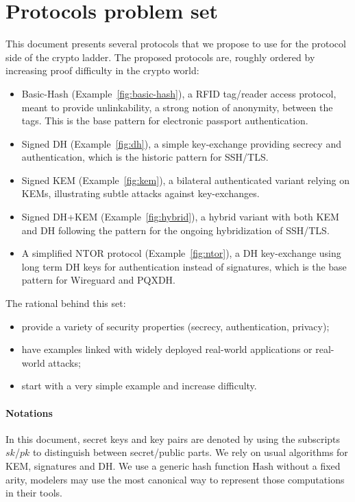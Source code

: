 \documentclass{article}
\newcommand{\sfsk}{\mathit{sk}}
\newcommand{\sfpk}{\mathit{pk}}
\newcommand{\kwf}[1]{\mathrm{#1}}
\newcommand{\hash}{\kwf{Hash}}
\begin{document}
\section{Protocols problem set}

This document presents several protocols that we propose to use for the protocol side of the crypto ladder. The proposed protocols are, roughly ordered by increasing proof difficulty in the crypto world:
\begin{itemize}
\item Basic-Hash (Example~\ref{fig:basic-hash}), a RFID tag/reader access protocol, meant to provide unlinkability, a strong notion of anonymity, between the tags. This is the base pattern for electronic passport authentication.
\item Signed DH (Example~\ref{fig:dh}), a simple key-exchange providing secrecy and authentication,  which is the historic pattern for SSH/TLS.
\item Signed KEM (Example~\ref{fig:kem}), a bilateral authenticated variant relying on KEMs, illustrating subtle attacks against key-exchanges. 
\item  Signed DH+KEM (Example~\ref{fig:hybrid}), a hybrid variant with both KEM and DH following the pattern for the ongoing hybridization of SSH/TLS.
\item A simplified NTOR protocol (Example~\ref{fig:ntor}), a DH key-exchange using long term DH keys for authentication instead of signatures, which is the base pattern for Wireguard and PQXDH.
\end{itemize}

The rational behind this set:
\begin{itemize}
\item provide a variety of security properties (secrecy, authentication, privacy);
\item have examples linked with widely deployed real-world applications or real-world attacks;
\item start with a very simple example and increase difficulty. 
\end{itemize}


\paragraph{Notations} In this document, secret keys and key pairs are denoted by using the subscripts $\sfsk$/$\sfpk$ to distinguish between secret/public parts. We rely on usual algorithms for KEM, signatures and DH. We use a generic hash function $\hash$ without a fixed arity, modelers may use the most canonical way to represent those computations in their tools.
\end{document}
